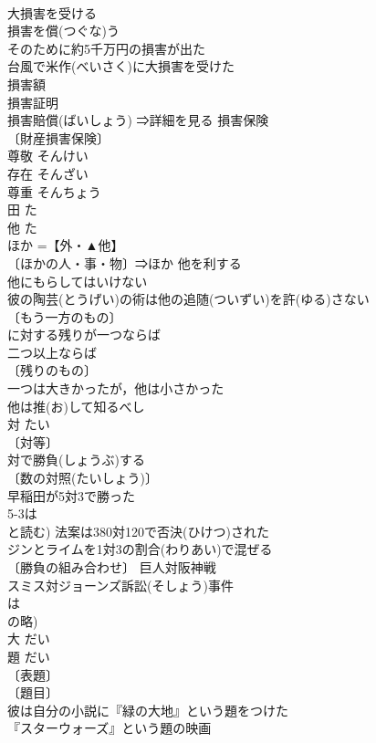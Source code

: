 \documentclass[8pt]{extreport}
\begin{document}
\begin{CJK}{UTF8}{min}
\\	大損害を受ける 
\\	損害を償(つぐな)う 
\\	そのために約5千万円の損害が出た 
\\	台風で米作(べいさく)に大損害を受けた 
\\	損害額 
\\	損害証明 
\\	損害賠償(ばいしょう) ⇒詳細を見る 損害保険 
\\	〔財産損害保険〕
\\	尊敬	そんけい	
\\	存在	そんざい	
\\	尊重	そんちょう	
\\	田	た	
\\	他	た	
\\	ほか =【外・▲他】 
\\	〔ほかの人・事・物〕⇒ほか 他を利する 
\\	他にもらしてはいけない 
\\	彼の陶芸(とうげい)の術は他の追随(ついずい)を許(ゆる)さない 
\\	〔もう一方のもの〕
\\	に対する残りが一つならば
\\	二つ以上ならば
\\	〔残りのもの〕
\\	一つは大きかったが，他は小さかった 
\\	他は推(お)して知るべし 
\\	対	たい	
\\	〔対等〕
\\	対で勝負(しょうぶ)する 
\\	〔数の対照(たいしょう)〕
\\	早稲田が5対3で勝った 
\\	5-3は
\\	と読む) 法案は380対120で否決(ひけつ)された 
\\	ジンとライムを1対3の割合(わりあい)で混ぜる 
\\	〔勝負の組み合わせ〕 巨人対阪神戦 
\\	スミス対ジョーンズ訴訟(そしょう)事件 
\\	は
\\	の略)
\\	大	だい	
\\	題	だい	
\\	〔表題〕
\\	〔題目〕
\\	彼は自分の小説に『緑の大地』という題をつけた 
\\	『スターウォーズ』という題の映画 

\end{CJK}
\end{document}
